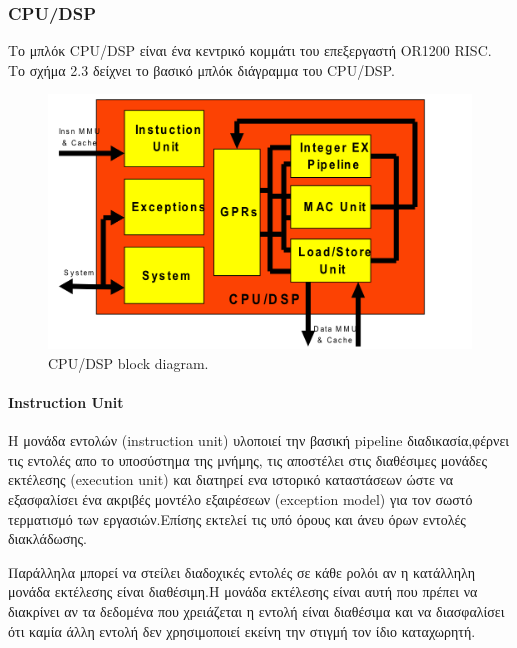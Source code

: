 \documentclass[a4paper,10pt]{article}
\numberwithin{figure}{section}
\numberwithin{table}{section}
\begin{document}
{\subsubsection{CPU/DSP}
Το μπλόκ CPU/DSP είναι ένα κεντρικό κομμάτι του επεξεργαστή OR1200 RISC. Το σχήμα 2.3 δείχνει
το βασικό μπλόκ διάγραμμα του CPU/DSP.

\vspace{0.7cm}
\begin{figure}[h!]
 \centering
 \includegraphics[bb=0 0 1020 613,scale=0.35]{./Images/cpu-dsp.png}
 \caption{CPU/DSP block diagram.}
\end{figure}

\vspace{0.7cm}

\paragraph{Instruction Unit\newline\newline}

Η μονάδα εντολών (instruction unit) υλοποιεί την βασική pipeline διαδικασία,φέρνει τις
εντολές απο το υποσύστημα της μνήμης, τις αποστέλει στις διαθέσιμες μονάδες εκτέλεσης (execution unit)
και διατηρεί ενα ιστορικό καταστάσεων ώστε να εξασφαλίσει ένα ακριβές μοντέλο εξαιρέσεων (exception model)
για τον σωστό τερματισμό των εργασιών.Επίσης εκτελεί τις υπό όρους και άνευ όρων εντολές διακλάδωσης.
\newline

Παράλληλα μπορεί να στείλει διαδοχικές εντολές σε κάθε ρολόι αν η κατάλληλη μονάδα εκτέλεσης
είναι διαθέσιμη.Η μονάδα εκτέλεσης είναι αυτή που πρέπει να διακρίνει αν τα δεδομένα που χρειάζεται
η εντολή είναι διαθέσιμα και να διασφαλίσει ότι καμία άλλη εντολή δεν χρησιμοποιεί εκείνη την
στιγμή τον ίδιο καταχωρητή.
\newline

}
\end{document}
